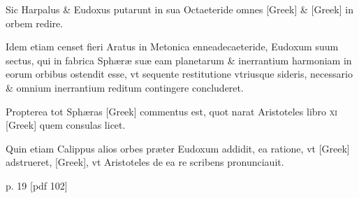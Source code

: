 \begin{parnumbers}
Sic Harpalus \& Eudoxus putarunt
in sua Octaeteride omnes \textgreek{[Greek]}
 \& \textgreek{[Greek]} in orbem redire.

Idem etiam censet fieri Aratus in Metonica enneadecaeteride, Eudoxum
suum sectus, qui in fabrica Sphæræ suæ eam planetarum \& inerrantium
harmoniam in eorum orbibus ostendit esse, vt sequente
restitutione vtriusque sideris, necessario \& omnium inerrantium reditum
contingere concluderet.

Propterea tot Sphæras \textgreek{[Greek]} commentus
est, quot narat Aristoteles libro \textsc{xi} \textgreek{[Greek]} quem
consulas licet.

Quin etiam Calippus alios orbes præter Eudoxum
addidit, ea ratione, vt \textgreek{[Greek]} adstrueret, \textgreek{[Greek]},
vt Aristoteles de ea re scribens pronunciauit.

\end{parnumbers}
\clearpage
p. 19 [pdf 102]
